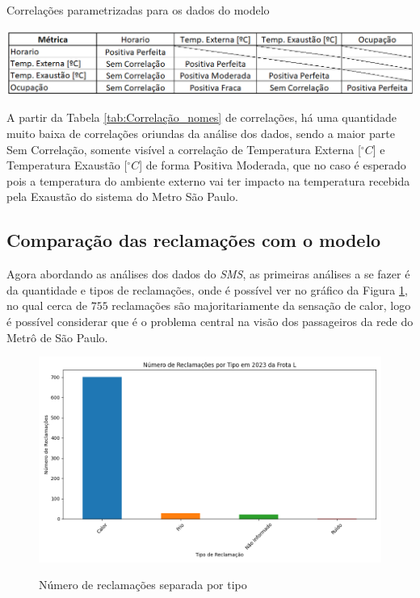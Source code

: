 \documentclass[acronym,symbols,table]{fei}
\begin{document}
\begin{table}[!htb]
 \centering
    \caption{Correlações parametrizadas para os dados do modelo}
    \includegraphics[width=1\linewidth]{Tabelas/Correlacao_nomes.png}
    \label{tab:Correlação_nomes}
\end{table}

 A partir da Tabela \ref{tab:Correlação_nomes} de correlações, há uma quantidade muito baixa de correlações oriundas da análise dos dados, sendo a maior parte Sem Correlação, somente visível a correlação de Temperatura Externa [$^\circ C$] e Temperatura Exaustão [$^\circ C$] de forma Positiva Moderada, que no caso é esperado pois a temperatura do ambiente externo vai ter impacto na temperatura recebida pela Exaustão do sistema do Metro São Paulo.


\subsection{Comparação das reclamações com o modelo} \label{comparamodelo}

Agora abordando as análises dos dados do \textit{SMS}, as primeiras análises a se fazer é da quantidade e tipos de reclamações, onde é possível ver no gráfico da Figura \ref{fig:reclamacao_tipo}, no qual cerca de $755$ reclamações são majoritariamente da sensação de calor, logo é possível considerar que é o problema central na visão dos passageiros da rede do Metrô de São Paulo. 

\begin{figure}[!htb]
    \centering
    \caption{Número de reclamações separada por tipo}
    \includegraphics[width=0.7\linewidth]{Imagens/reclamacao_tipo.png}
    \label{fig:reclamacao_tipo}
\end{figure}
\end{document}
